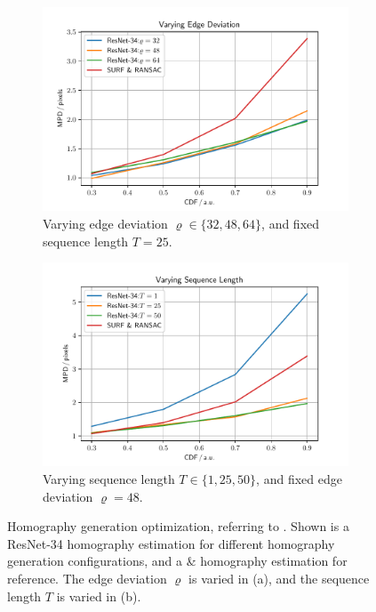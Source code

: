 \begin{figure}[tb]
\centering
\begin{subfigure}[b]{0.49\textwidth}
    \centering
    \includegraphics[width=\textwidth]{fig/frac/var_rho.pdf}
    \caption{Varying edge deviation $\varrho\in\{32,48,64\}$, and fixed sequence length $T=25$.}
    \label{c3:fig:resnet34_a}
\end{subfigure}
\begin{subfigure}[b]{0.49\textwidth}
    \centering
    \includegraphics[width=\textwidth]{fig/frac/var_seq.pdf}
    \caption{Varying sequence length $T\in\{1,25,50\}$, and fixed edge deviation $\varrho=48$.}
    \label{c3:fig:resnet34_b}
\end{subfigure}
\caption{Homography generation optimization, referring to . Shown is a ResNet-34 homography estimation for different homography generation configurations, and a  \&  homography estimation for reference. The edge deviation $\varrho$ is varied in (a), and the sequence length $T$ is varied in (b).}
\label{c3:fig:resnet34}
\end{figure}

